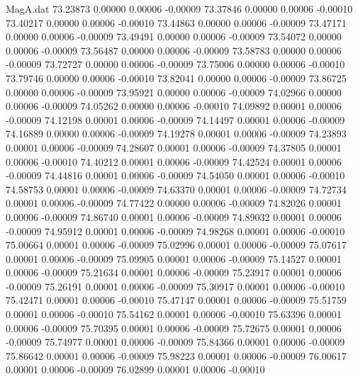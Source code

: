 \begin{filecontents}{MagA.dat}
  73.23873    0.00000    0.00006   -0.00009
  73.37846    0.00000    0.00006   -0.00010
  73.40217    0.00000    0.00006   -0.00010
  73.44863    0.00000    0.00006   -0.00009
  73.47171    0.00000    0.00006   -0.00009
  73.49491    0.00000    0.00006   -0.00009
  73.54072    0.00000    0.00006   -0.00009
  73.56487    0.00000    0.00006   -0.00009
  73.58783    0.00000    0.00006   -0.00009
  73.72727    0.00000    0.00006   -0.00009
  73.75006    0.00000    0.00006   -0.00010
  73.79746    0.00000    0.00006   -0.00010
  73.82041    0.00000    0.00006   -0.00009
  73.86725    0.00000    0.00006   -0.00009
  73.95921    0.00000    0.00006   -0.00009
  74.02966    0.00000    0.00006   -0.00009
  74.05262    0.00000    0.00006   -0.00010
  74.09892    0.00001    0.00006   -0.00009
  74.12198    0.00001    0.00006   -0.00009
  74.14497    0.00001    0.00006   -0.00009
  74.16889    0.00000    0.00006   -0.00009
  74.19278    0.00001    0.00006   -0.00009
  74.23893    0.00001    0.00006   -0.00009
  74.28607    0.00001    0.00006   -0.00009
  74.37805    0.00001    0.00006   -0.00010
  74.40212    0.00001    0.00006   -0.00009
  74.42524    0.00001    0.00006   -0.00009
  74.44816    0.00001    0.00006   -0.00009
  74.54050    0.00001    0.00006   -0.00010
  74.58753    0.00001    0.00006   -0.00009
  74.63370    0.00001    0.00006   -0.00009
  74.72734    0.00001    0.00006   -0.00009
  74.77422    0.00000    0.00006   -0.00009
  74.82026    0.00001    0.00006   -0.00009
  74.86740    0.00001    0.00006   -0.00009
  74.89032    0.00001    0.00006   -0.00009
  74.95912    0.00001    0.00006   -0.00009
  74.98268    0.00001    0.00006   -0.00010
  75.00664    0.00001    0.00006   -0.00009
  75.02996    0.00001    0.00006   -0.00009
  75.07617    0.00001    0.00006   -0.00009
  75.09905    0.00001    0.00006   -0.00009
  75.14527    0.00001    0.00006   -0.00009
  75.21634    0.00001    0.00006   -0.00009
  75.23917    0.00001    0.00006   -0.00009
  75.26191    0.00001    0.00006   -0.00009
  75.30917    0.00001    0.00006   -0.00010
  75.42471    0.00001    0.00006   -0.00010
  75.47147    0.00001    0.00006   -0.00009
  75.51759    0.00001    0.00006   -0.00010
  75.54162    0.00001    0.00006   -0.00010
  75.63396    0.00001    0.00006   -0.00009
  75.70395    0.00001    0.00006   -0.00009
  75.72675    0.00001    0.00006   -0.00009
  75.74977    0.00001    0.00006   -0.00009
  75.84366    0.00001    0.00006   -0.00009
  75.86642    0.00001    0.00006   -0.00009
  75.98223    0.00001    0.00006   -0.00009
  76.00617    0.00001    0.00006   -0.00009
  76.02899    0.00001    0.00006   -0.00010

\end{filecontents}
